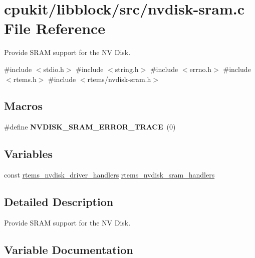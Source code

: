 \hypertarget{nvdisk-sram_8c}{}\section{cpukit/libblock/src/nvdisk-\/sram.c File Reference}
\label{nvdisk-sram_8c}


Provide S\+R\+AM support for the NV Disk.  


{\ttfamily \#include $<$stdio.\+h$>$}\newline
{\ttfamily \#include $<$string.\+h$>$}\newline
{\ttfamily \#include $<$errno.\+h$>$}\newline
{\ttfamily \#include $<$rtems.\+h$>$}\newline
{\ttfamily \#include $<$rtems/nvdisk-\/sram.\+h$>$}\newline
\subsection*{Macros}
\begin{DoxyCompactItemize}
\item 
\mbox{\label{nvdisk-sram_8c_adab29cb238d3118179c8b9bc7cd30b49}} 
\#define {\bfseries N\+V\+D\+I\+S\+K\+\_\+\+S\+R\+A\+M\+\_\+\+E\+R\+R\+O\+R\+\_\+\+T\+R\+A\+CE}~(0)
\end{DoxyCompactItemize}
\subsection*{Variables}
\begin{DoxyCompactItemize}
\item 
const \mbox{\hyperlink{structrtems__nvdisk__driver__handlers}{rtems\+\_\+nvdisk\+\_\+driver\+\_\+handlers}} \mbox{\hyperlink{nvdisk-sram_8c_ad46debc476911ad0b3e2ffdf17ea2ab3}{rtems\+\_\+nvdisk\+\_\+sram\+\_\+handlers}}
\end{DoxyCompactItemize}


\subsection{Detailed Description}
Provide S\+R\+AM support for the NV Disk. 



\subsection{Variable Documentation}
\mbox{\label{nvdisk-sram_8c_ad46debc476911ad0b3e2ffdf17ea2ab3}} 
